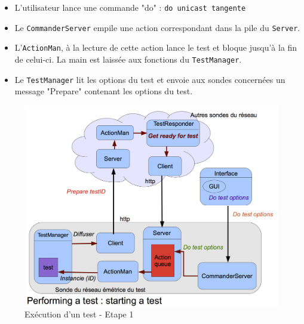 \documentclass[a4paper,11pt]{article}
\begin{document}
\begin{itemize}
\item L'utilisateur lance une commande "do" : \texttt{do unicast tangente}
\item Le \texttt{CommanderServer} empile une action correspondant dans la pile du \texttt{Server}.
\item L'\texttt{ActionMan}, à la lecture de cette action lance le test et bloque jusqu'à la fin de celui-ci. La main est laissée aux fonctions du \texttt{TestManager}.
\item Le \texttt{TestManager} lit les options du test et envoie aux sondes concernées un message "Prepare" contenant les options du test.

\end{itemize}
\begin{figure}[!ht]
\centering\includegraphics[width=0.8\linewidth]{img/graphTest1.png}
\caption{Exécution d'un test - Etape 1}
\end{figure}
\end{document}
